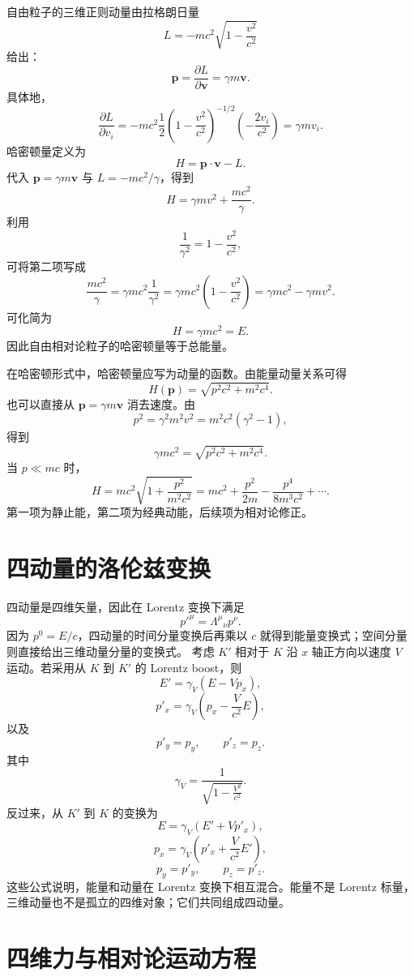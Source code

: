 自由粒子的三维正则动量由拉格朗日量
\[
L=-mc^{2}\sqrt{1-\frac{v^{2}}{c^{2}}}
\]
给出：
\[
\bm{p}=\frac{\partial L}{\partial\bm{v}}=\gamma m\bm{v}.
\]
具体地，
\[
\frac{\partial L}{\partial v_{i}}
=
-mc^{2}\frac{1}{2}
\left(1-\frac{v^{2}}{c^{2}}\right)^{-1/2}
\left(-\frac{2v_{i}}{c^{2}}\right)
=
\gamma mv_{i}.
\]
哈密顿量定义为
\[
H=\bm{p}\cdot\bm{v}-L.
\]
代入 $\bm{p}=\gamma m\bm{v}$ 与 $L=-mc^{2}/\gamma$，得到
\[
H=\gamma mv^{2}+\frac{mc^{2}}{\gamma}.
\]
利用
\[
\frac{1}{\gamma^{2}}=1-\frac{v^{2}}{c^{2}},
\]
可将第二项写成
\[
\frac{mc^{2}}{\gamma}
=
\gamma mc^{2}\frac{1}{\gamma^{2}}
=
\gamma mc^{2}\left(1-\frac{v^{2}}{c^{2}}\right)
=
\gamma mc^{2}-\gamma mv^{2}.
\]
可化简为
\[
H=\gamma mc^{2}=E.
\]
因此自由相对论粒子的哈密顿量等于总能量。

在哈密顿形式中，哈密顿量应写为动量的函数。由能量动量关系可得
\[
H(\bm{p})=\sqrt{p^{2}c^{2}+m^{2}c^{4}}.
\]
也可以直接从 $\bm{p}=\gamma m\bm{v}$ 消去速度。由
\[
p^{2}
=
\gamma^{2}m^{2}v^{2}
=
m^{2}c^{2}(\gamma^{2}-1),
\]
得到
\[
\gamma mc^{2}
=
\sqrt{p^{2}c^{2}+m^{2}c^{4}}.
\]
当 $p\ll mc$ 时，
\[
H=mc^{2}\sqrt{1+\frac{p^{2}}{m^{2}c^{2}}}
=
mc^{2}+\frac{p^{2}}{2m}-\frac{p^{4}}{8m^{3}c^{2}}+\cdots .
\]
第一项为静止能，第二项为经典动能，后续项为相对论修正。

\section{四动量的洛伦兹变换}

四动量是四维矢量，因此在 Lorentz 变换下满足
\[
p'^{\mu}=\Lambda^{\mu}{}_{\nu}p^{\nu}.
\]
因为 $p^{0}=E/c$，四动量的时间分量变换后再乘以 $c$ 就得到能量变换式；空间分量则直接给出三维动量分量的变换式。
考虑 $K'$ 相对于 $K$ 沿 $x$ 轴正方向以速度 $V$ 运动。若采用从 $K$ 到 $K'$ 的 Lorentz boost，则
\[
E'=\gamma_{V}(E-Vp_{x}),
\]
\[
p'_{x}=\gamma_{V}\left(p_{x}-\frac{V}{c^{2}}E\right),
\]
以及
\[
p'_{y}=p_{y},
\qquad
p'_{z}=p_{z}.
\]
其中
\[
\gamma_{V}=\frac{1}{\sqrt{1-\frac{V^{2}}{c^{2}}}}.
\]
反过来，从 $K'$ 到 $K$ 的变换为
\[
E=\gamma_{V}(E'+Vp'_{x}),
\]
\[
p_{x}=\gamma_{V}\left(p'_{x}+\frac{V}{c^{2}}E'\right),
\]
\[
p_{y}=p'_{y},
\qquad
p_{z}=p'_{z}.
\]
这些公式说明，能量和动量在 Lorentz 变换下相互混合。能量不是 Lorentz 标量，三维动量也不是孤立的四维对象；它们共同组成四动量。

\section{四维力与相对论运动方程}


